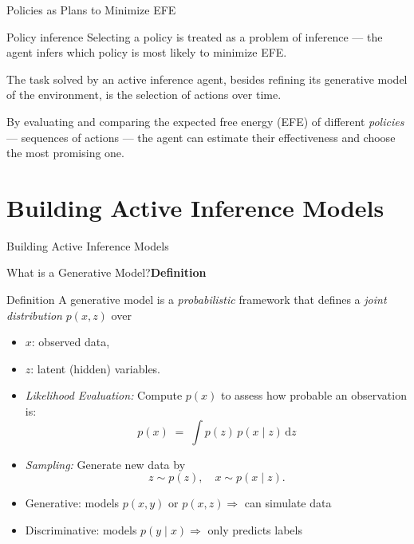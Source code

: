 \documentclass[aspectratio=1610, english]{beamer}
\begin{document}
\begin{frame}{Policies as Plans to Minimize EFE}
    \begin{block}{Policy inference}
        Selecting a policy is treated as a problem of inference — the agent infers which policy is most likely to minimize EFE.
    \end{block}
    
    The task solved by an active inference agent, besides refining its generative model of the environment, is the selection of actions over time.
    
    \vspace{0.3cm}
    
    By evaluating and comparing the expected free energy (EFE) of different \emph{policies} — sequences of actions — the agent can estimate their effectiveness and choose the most promising one.
\end{frame}


\section{Building Active Inference Models}
\begin{frame}{Building Active Inference Models}
    \sectionpage
\end{frame}

\begin{frame}{What is a Generative Model?}\textbf{Definition} 
    \begin{block}{Definition}
          A generative model is a \emph{probabilistic} framework that 
          defines a \emph{joint distribution} \(p(x, z)\) over 
          \begin{itemize}
            \item \(x\): observed data,
            \item \(z\): latent (hidden) variables.
          \end{itemize}
    \end{block}
    \begin{itemize}
        \item \emph{Likelihood Evaluation:} Compute \(p(x)\) to assess how probable an observation is:
              \[
                p(x) \;=\;\int p(z)\,p(x\mid z)\,\mathrm{d}z
              \]
        \item \emph{Sampling:} Generate new data by 
              \[
                z\sim p(z),\quad x\sim p(x\mid z).
              \]
        \item Generative: models \(p(x, y)\) or \(p(x, z) \Rightarrow\) can simulate data  
        \item Discriminative: models \(p(y\mid x) \Rightarrow\) only predicts labels
    \end{itemize}
\end{frame}
\end{document}
